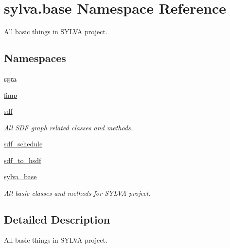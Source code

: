 \hypertarget{namespacesylva_1_1base}{}\section{sylva.\+base Namespace Reference}
\label{namespacesylva_1_1base}


All basic things in S\+Y\+L\+VA project.  


\subsection*{Namespaces}
\begin{DoxyCompactItemize}
\item 
 \hyperlink{namespacesylva_1_1base_1_1cgra}{cgra}
\item 
 \hyperlink{namespacesylva_1_1base_1_1fimp}{fimp}
\item 
 \hyperlink{namespacesylva_1_1base_1_1sdf}{sdf}
\begin{DoxyCompactList}\small\item\em All S\+DF graph related classes and methods. \end{DoxyCompactList}\item 
 \hyperlink{namespacesylva_1_1base_1_1sdf__schedule}{sdf\+\_\+schedule}
\item 
 \hyperlink{namespacesylva_1_1base_1_1sdf__to__hsdf}{sdf\+\_\+to\+\_\+hsdf}
\item 
 \hyperlink{namespacesylva_1_1base_1_1sylva__base}{sylva\+\_\+base}
\begin{DoxyCompactList}\small\item\em All basic classes and methods for S\+Y\+L\+VA project. \end{DoxyCompactList}\end{DoxyCompactItemize}


\subsection{Detailed Description}
All basic things in S\+Y\+L\+VA project. 